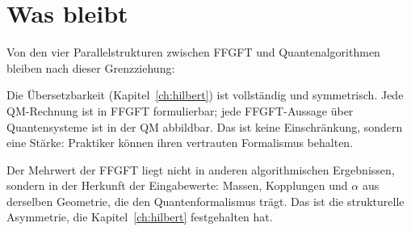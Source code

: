 \section{Was bleibt}

Von den vier Parallelstrukturen zwischen FFGFT und Quantenalgorithmen
bleiben nach dieser Grenzziehung:

Die Übersetzbarkeit (Kapitel~\ref{ch:hilbert}) ist vollständig und
symmetrisch. Jede QM-Rechnung ist in FFGFT formulierbar; jede FFGFT-Aussage
über Quantensysteme ist in der QM abbildbar. Das ist keine Einschränkung,
sondern eine Stärke: Praktiker können ihren vertrauten Formalismus
behalten.

Der Mehrwert der FFGFT liegt nicht in anderen algorithmischen Ergebnissen,
sondern in der Herkunft der Eingabewerte: Massen, Kopplungen und
$\alpha$ aus derselben Geometrie, die den Quantenformalismus trägt. Das
ist die strukturelle Asymmetrie, die Kapitel~\ref{ch:hilbert} festgehalten
hat.

